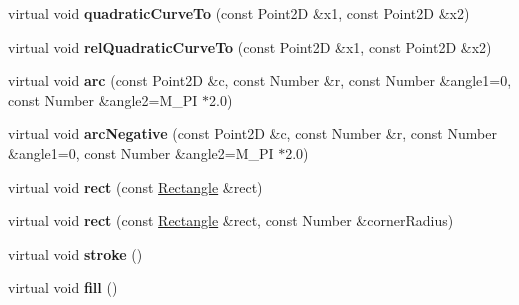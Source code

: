 \begin{DoxyCompactItemize}
\item 
\hypertarget{classsambag_1_1disco_1_1_cairo_draw_context_adf858391bfd5cf0b3fed2094a6d5d524}{
virtual void {\bfseries quadraticCurveTo} (const Point2D \&x1, const Point2D \&x2)}
\label{classsambag_1_1disco_1_1_cairo_draw_context_adf858391bfd5cf0b3fed2094a6d5d524}

\item 
\hypertarget{classsambag_1_1disco_1_1_cairo_draw_context_aef79e684ed1a3390e0f5ca090022a3c6}{
virtual void {\bfseries relQuadraticCurveTo} (const Point2D \&x1, const Point2D \&x2)}
\label{classsambag_1_1disco_1_1_cairo_draw_context_aef79e684ed1a3390e0f5ca090022a3c6}

\item 
\hypertarget{classsambag_1_1disco_1_1_cairo_draw_context_a28aa2bd5f5032114716f8062bfd7446a}{
virtual void {\bfseries arc} (const Point2D \&c, const Number \&r, const Number \&angle1=0, const Number \&angle2=M\_\-PI $\ast$2.0)}
\label{classsambag_1_1disco_1_1_cairo_draw_context_a28aa2bd5f5032114716f8062bfd7446a}

\item 
\hypertarget{classsambag_1_1disco_1_1_cairo_draw_context_a4c4be120cecd1fff712025129853e30f}{
virtual void {\bfseries arcNegative} (const Point2D \&c, const Number \&r, const Number \&angle1=0, const Number \&angle2=M\_\-PI $\ast$2.0)}
\label{classsambag_1_1disco_1_1_cairo_draw_context_a4c4be120cecd1fff712025129853e30f}

\item 
\hypertarget{classsambag_1_1disco_1_1_cairo_draw_context_a3361d581f01a4fbca5afde6ee2d27183}{
virtual void {\bfseries rect} (const \hyperlink{classsambag_1_1com_1_1_rectangle}{Rectangle} \&rect)}
\label{classsambag_1_1disco_1_1_cairo_draw_context_a3361d581f01a4fbca5afde6ee2d27183}

\item 
\hypertarget{classsambag_1_1disco_1_1_cairo_draw_context_a141b8f4311079eef3d2c53d25dcb2c25}{
virtual void {\bfseries rect} (const \hyperlink{classsambag_1_1com_1_1_rectangle}{Rectangle} \&rect, const Number \&cornerRadius)}
\label{classsambag_1_1disco_1_1_cairo_draw_context_a141b8f4311079eef3d2c53d25dcb2c25}

\item 
\hypertarget{classsambag_1_1disco_1_1_cairo_draw_context_aaa3aa1fea122b50ce02fa85fa8d1ddab}{
virtual void {\bfseries stroke} ()}
\label{classsambag_1_1disco_1_1_cairo_draw_context_aaa3aa1fea122b50ce02fa85fa8d1ddab}

\item 
\hypertarget{classsambag_1_1disco_1_1_cairo_draw_context_a25c089ea5aef85839c191c1da96c19c8}{
virtual void {\bfseries fill} ()}
\label{classsambag_1_1disco_1_1_cairo_draw_context_a25c089ea5aef85839c191c1da96c19c8}


\end{DoxyCompactItemize}
